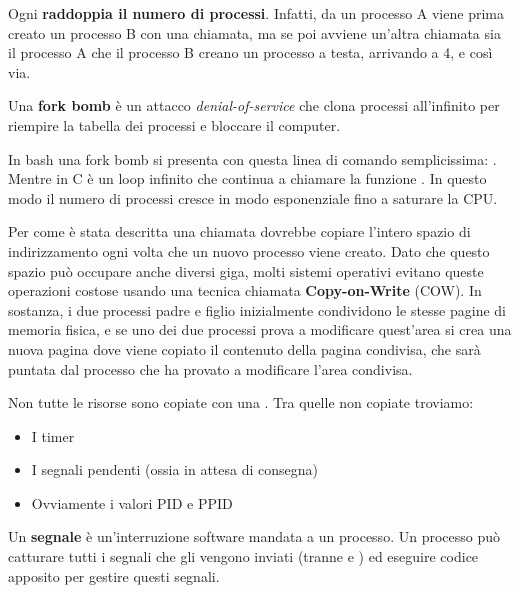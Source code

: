 \documentclass[11pt, a4paper, titlepage, oneside]{scrbook}
\begin{document}
\begin{Osservazione}[]
\label{oss-piu-fork}
Ogni  \textbf{raddoppia il numero di processi}. Infatti, da un processo A viene prima creato un processo B con una chiamata, ma se poi avviene un'altra chiamata sia il processo A che il processo B creano un processo a testa, arrivando a 4, e così via.
\end{Osservazione}

\begin{Definizione}
\label{def-fork-bomb}
Una \textbf{fork bomb} è un attacco \textit{denial-of-service} che clona processi all'infinito per riempire la tabella dei processi e bloccare il computer.
\end{Definizione}

In bash una fork bomb si presenta con questa linea di comando semplicissima: \code{:(){ :|: \&};:}. Mentre in C è un loop infinito che continua a chiamare la funzione . In questo modo il numero di processi cresce in modo esponenziale fino a saturare la CPU. 

\begin{Proprieta}
\label{prop-copy-on-write}
Per come è stata descritta una chiamata  dovrebbe copiare l'intero spazio di indirizzamento ogni volta che un nuovo processo viene creato. Dato che questo spazio può occupare anche diversi giga, molti sistemi operativi evitano queste operazioni costose usando una tecnica chiamata \textbf{Copy-on-Write} (COW). In sostanza, i due processi padre e figlio inizialmente condividono le stesse pagine di memoria fisica, e se uno dei due processi prova a modificare quest'area si crea una nuova pagina dove viene copiato il contenuto della pagina condivisa, che sarà puntata dal processo che ha provato a modificare l'area condivisa. 
\end{Proprieta}

Non tutte le risorse sono copiate con una . Tra quelle non copiate troviamo:
\begin{itemize}
    \item I timer
    \item I segnali pendenti (ossia in attesa di consegna)
    \item Ovviamente i valori PID e PPID
\end{itemize}

\begin{Definizione}[Segnale]
\label{def-segnale}
Un \textbf{segnale} è un'interruzione software mandata a un processo. Un processo può catturare tutti i segnali che gli vengono inviati (tranne  e ) ed eseguire codice apposito per gestire questi segnali.
\end{Definizione}
\end{document}
